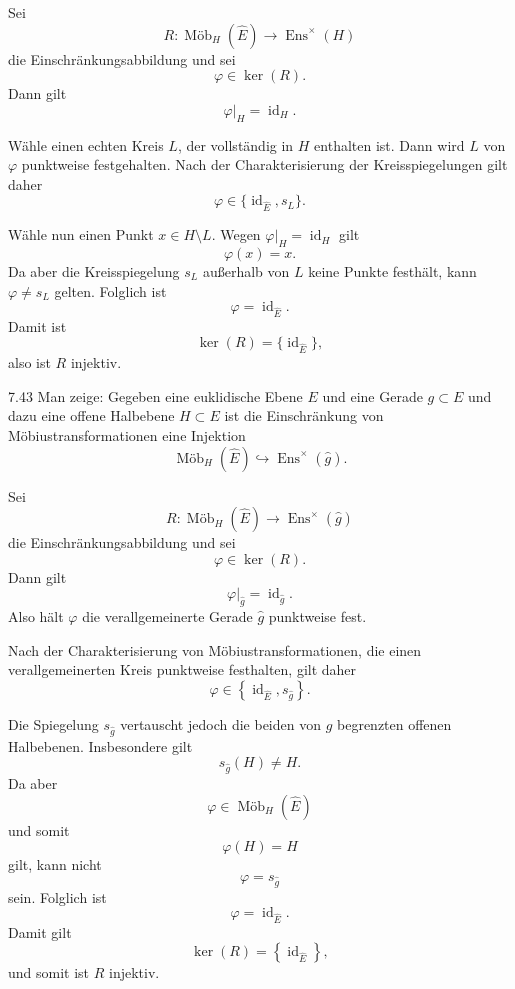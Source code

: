 Sei
\[
    R:\operatorname{Möb}_H(\widehat E)
    \longrightarrow
    \operatorname{Ens}^{\times}(H)
\]
die Einschränkungsabbildung und sei
\[
    \varphi\in\ker(R).
\]
Dann gilt
\[
    \varphi|_H=\operatorname{id}_H.
\]

Wähle einen echten Kreis \(L\), der vollständig in \(H\) enthalten ist.
Dann wird \(L\) von \(\varphi\) punktweise festgehalten. Nach der
Charakterisierung der Kreisspiegelungen gilt daher
\[
    \varphi\in\{\operatorname{id}_{\widehat E},s_L\}.
\]

Wähle nun einen Punkt \(x\in H\setminus L\). Wegen
\(\varphi|_H=\operatorname{id}_H\) gilt
\[
    \varphi(x)=x.
\]
Da aber die Kreisspiegelung \(s_L\) außerhalb von \(L\) keine Punkte
festhält, kann \(\varphi\neq s_L\) gelten. Folglich ist
\[
    \varphi=\operatorname{id}_{\widehat E}.
\]
Damit ist
\[
    \ker(R)=\{\operatorname{id}_{\widehat E}\},
\]
also ist \(R\) injektiv.

\begin{exercise}{7.4}{3}
    Man zeige: Gegeben eine euklidische Ebene \(E\) und eine Gerade
    \(g \subset E\) und dazu eine offene Halbebene \(H \subset E\) ist die
    Einschränkung von Möbiustransformationen eine Injektion
    \[
        \operatorname{Möb}_H(\widehat E)
        \hookrightarrow
        \operatorname{Ens}^{\times}(\widehat g).
    \]
\end{exercise}

Sei
\[
    R:
    \operatorname{Möb}_H(\widehat E)
    \longrightarrow
    \operatorname{Ens}^{\times}(\widehat g)
\]
die Einschränkungsabbildung und sei
\[
    \varphi\in\ker(R).
\]
Dann gilt
\[
    \varphi|_{\widehat g}
    =
    \operatorname{id}_{\widehat g}.
\]
Also hält \(\varphi\) die verallgemeinerte Gerade \(\widehat g\)
punktweise fest.

Nach der Charakterisierung von Möbiustransformationen, die einen
verallgemeinerten Kreis punktweise festhalten, gilt daher
\[
    \varphi
    \in
    \left\{
        \operatorname{id}_{\widehat E},
        s_{\widehat g}
    \right\}.
\]

Die Spiegelung \(s_{\widehat g}\) vertauscht jedoch die beiden von
\(g\) begrenzten offenen Halbebenen. Insbesondere gilt
\[
    s_{\widehat g}(H)\neq H.
\]
Da aber
\[
    \varphi\in\operatorname{Möb}_H(\widehat E)
\]
und somit
\[
    \varphi(H)=H
\]
gilt, kann nicht
\[
    \varphi=s_{\widehat g}
\]
sein. Folglich ist
\[
    \varphi=\operatorname{id}_{\widehat E}.
\]
Damit gilt
\[
    \ker(R)
    =
    \left\{
        \operatorname{id}_{\widehat E}
    \right\},
\]
und somit ist \(R\) injektiv.
